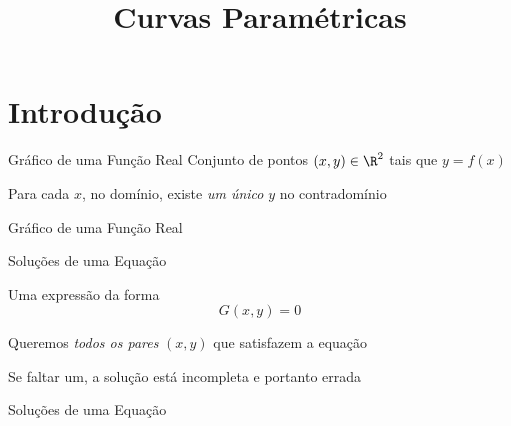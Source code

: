 
\usepackage{calculo_varias_variaveis-1}

\title {Curvas Paramétricas}



\addtitle

\section{Introdução}


\begin{frame}{Gráfico de uma Função Real}
  Conjunto de pontos $(x, y) \in \R^2$ tais que \(y = f(x)\)

  \pause
  \vspace{\baselineskip}
  Para cada $x$, no domínio, existe \emph{um único} $y$ no contradomínio
\end{frame}

\begin{frame}{Gráfico de uma Função Real}
  \centering
  
\end{frame}

\begin{frame}{Soluções de uma Equação}

  Uma expressão da forma
  \[
    G(x, y) = 0
  \]

  \pause
  \vspace{\baselineskip}
  Queremos \emph{todos os pares} $(x, y)$ que satisfazem a equação

  \pause
  \vspace{\baselineskip}
  Se faltar um, a solução está incompleta e portanto errada
\end{frame}

\begin{frame}{Soluções de uma Equação}
  \centering
  
\end{frame}

